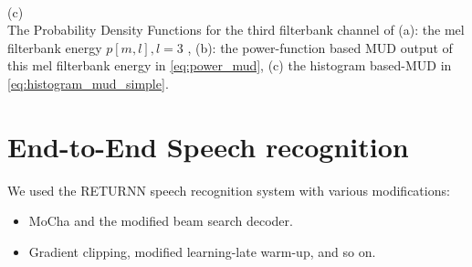 \documentclass[a0,portrait]{a0poster}
\newenvironment{Figure}
  {\par\medskip\noindent\minipage{\linewidth}}
  {\endminipage\par\medskip}
\begin{document}
\begin{multicols}{2}
\begin{minipage}[]{0.54\linewidth}
\begin{Figure}
\begin{center}
{      \label{fig:histogram_based_mud_output_histogram} \\
      (c)
    }   
    \\
     {
      The Probability Density Functions for the third filterbank channel
       of (a): the mel filterbank energy $p[m, l], l = 3$ 
       , (b): the power-function based MUD 
      output of this mel filterbank energy in \eqref{eq:power_mud}, (c) 
      the histogram based-MUD in \eqref{eq:histogram_mud_simple}. 
      \label{fig:pdf_mud}
    }   
   \vspace{-7mm}
  \end{center}
\end{Figure}
\end{minipage}
%
%
\begin{minipage}[]{0.45\linewidth}
  \begin{Figure}
  \begin{center}
  \resizebox{150mm}{!}{}
  \end{center}
  \end{Figure}
\end{minipage}

%

%




\section{End-to-End Speech recognition}
 We used the RETURNN speech recognition system \cite{a_zeyer_interspeech_2018_00} with various modifications:
    \begin{itemize}
      \item{MoCha\cite{k_kim_asru_2019_00} and the modified beam search decoder.}
      \item{Gradient clipping, modified learning-late warm-up, and so on.}
    \end{itemize}


\end{multicols}
\end{document}
